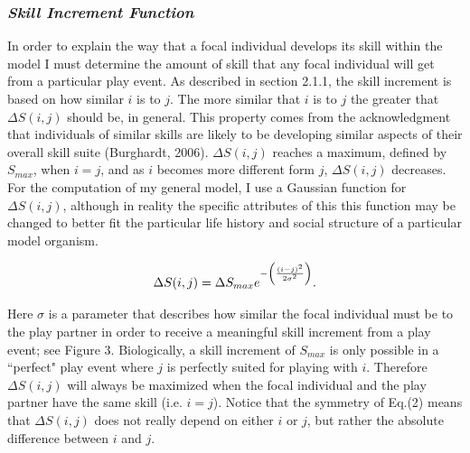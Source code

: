 \documentclass[12pt,letterpaper]{article}
\begin{document}
    \subsubsection{\it Skill Increment Function}
      In order to explain the way that a focal individual develops its skill within the model I must determine the amount of skill that any focal individual will get from a particular play event.
      As described in section 2.1.1, the skill increment is based on how similar $i$ is to $j$.
      The more similar that $i$ is to $j$ the greater that $\Delta S(i,j)$ should be, in general.
      This property comes from the acknowledgment that individuals of similar skills are likely to be developing similar aspects of their overall skill suite (Burghardt, 2006).
      $\Delta S(i,j)$ reaches a maximum, defined by $S_{max}$, when $i=j$, and as $i$ becomes more different form $j$, $\Delta S(i,j)$ decreases.
      For the computation of my general model, I use a Gaussian function for $\Delta S(i,j)$, although in reality the specific attributes of this this function may be changed to better fit the particular life history and social structure of a particular model organism.%
      
      \begin{equation}
      \Delta S(i,j) = \Delta S_{max} e^{ - \left( (i-j)^2 \over 2\sigma^2 \right) }.
      \label{sdf}
      \end{equation}
      
      Here $\sigma$ is a parameter that describes how similar the focal individual must be to the play partner in order to receive a meaningful skill increment from a play event; see Figure 3.
      Biologically, a skill increment of $S_{max}$ is only possible in a ``perfect" play event where $j$ is perfectly suited for playing with $i$.
      Therefore $\Delta S(i,j)$ will always be maximized when the focal individual and the play partner have the same skill (i.e. $i = j$).    
      Notice that the symmetry of Eq.(2) means that $\Delta S(i,j)$ does not really depend on either $i$ or $j$, but rather the absolute difference between $i$ and $j$.    
      
\end{document}
